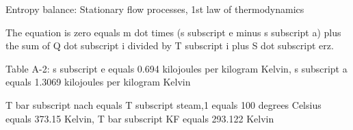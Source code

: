 Entropy balance: Stationary flow processes, 1st law of thermodynamics

The equation is zero equals m dot times (s subscript e minus s subscript a) plus the sum of Q dot subscript i divided by T subscript i plus S dot subscript erz.

Table A-2: s subscript e equals 0.694 kilojoules per kilogram Kelvin, s subscript a equals 1.3069 kilojoules per kilogram Kelvin

T bar subscript nach equals T subscript steam,1 equals 100 degrees Celsius equals 373.15 Kelvin, T bar subscript KF equals 293.122 Kelvin